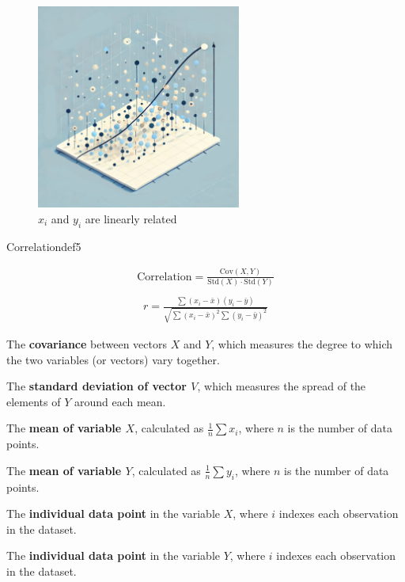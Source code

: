 \documentclass[
  12 pt,
  a4paper,
]{book}
\numberwithin{equation}{section}
\theoremstyle{plain}      %
\theoremstyle{definition} %
\theoremstyle{remark}     %
\theoremstyle{note}         %
\begin{document}
\hfill\break

\begin{figure}[h!]
  \begin{center}
    \includegraphics[width=0.6\textwidth]{pictures/Whimsical-5-correlation.jpeg}
    \caption*{\Large $x_i$ and $y_i$ are linearly related}
  \end{center}
\end{figure}

\newpage

\vspace*{\fill}
\begin{a_def_eq}{Correlation}{def5} 

\begin{align}\label{r_XY}
\text{Correlation} = \frac{\text{Cov}(X, Y)}{\text{Std}(X) \cdot \text{Std}(Y)}\\
\end{align}
\begin{align}\label{r_pearson}
r = \frac{\sum (x_i - \bar{x})(y_i - \bar{y})}{\sqrt{\sum (x_i - \bar{x})^2 \sum (y_i - \bar{y})^2}}
\end{align}

\begin{description}[align=left, labelwidth=2.2cm, labelsep=0em, leftmargin=2.2cm]
    \item[$\text{Cov}(X, Y)$] The \textbf{covariance} between vectors \( X \) and \( Y \), which measures the degree to which the two variables (or vectors) vary together.
    \item[$\text{Std}(V)$] The \textbf{standard deviation of vector \( V \)}, which measures the spread of the elements of \( Y \)  around each mean.
    \item[$\bar{x}$] The \textbf{mean of variable \( X \)}, calculated as \( \frac{1}{n} \sum x_i \), where \( n \) is the number of data points.
    \item[$\bar{y}$] The \textbf{mean of variable \( Y \)}, calculated as \( \frac{1}{n} \sum y_i \), where \( n \) is the number of data points.
    \item[$x_i$] The \textbf{individual data point} in the variable \( X \), where \( i \) indexes each observation in the dataset.
    \item[$y_i$] The \textbf{individual data point} in the variable \( Y \), where \( i \) indexes each observation in the dataset.
\end{description}

\end{a_def_eq}
\end{document}
